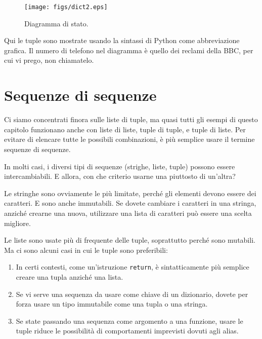 \documentclass[10pt]{book}
\begin{document}
\begin{figure}
\centerline
{\texttt{[image: figs/dict2.eps]}}
\caption{Diagramma di stato.}
\label{fig.dict2}
\end{figure}

Qui le tuple sono mostrate usando la sintassi di Python come abbreviazione grafica. Il numero di telefono nel diagramma è quello dei reclami della BBC, per cui vi prego, non chiamatelo.


\section{Sequenze di sequenze}

Ci siamo concentrati finora sulle liste di tuple, ma quasi tutti gli esempi di questo capitolo funzionano anche con liste di liste, tuple di tuple, e tuple di liste. Per evitare di elencare tutte le possibili combinazioni, è più semplice usare il termine sequenze di sequenze.

In molti casi, i diversi tipi di sequenze (strighe, liste, tuple) possono essere intercambiabili. E allora, con che criterio usarne una piuttosto di un'altra?

Le stringhe sono ovviamente le più limitate, perché gli elementi devono essere dei caratteri. E sono anche immutabili. Se dovete cambiare i caratteri in una stringa, anziché crearne una nuova, utilizzare una lista di caratteri può essere una scelta migliore.

Le liste sono usate più di frequente delle tuple, soprattutto perché sono mutabili. Ma ci sono alcuni casi in cui le tuple sono preferibili:

\begin{enumerate}

\item In certi contesti, come un'istruzione {\tt return}, è sintatticamente più semplice creare una tupla anziché una lista.

\item Se vi serve una sequenza da usare come chiave di un dizionario, dovete per forza usare un tipo immutabile come una tupla o una stringa.

\item Se state passando una sequenza come argomento a una funzione, usare le tuple riduce le possibilità di comportamenti imprevisti dovuti agli alias.

\end{enumerate}
\end{document}

